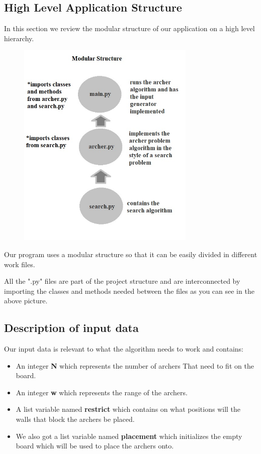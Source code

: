 \documentclass{article}
\begin{document}
\subsection{High Level Application Structure}
\par In this section we review the modular structure of our application on a high level hierarchy. 
\begin{figure}[h]
\includegraphics[width=12 cm, height=10cm]{figure3}
\end{figure}
\par Our program uses a modular structure so that it can be easily divided 
in different work files.
\par All the ".py" files are part of the project structure and are interconnected by importing the classes and methods needed between the files as you can see in the above picture.
\newpage
\subsection{Description of input data}
\par Our input data is relevant to what the algorithm needs to work and contains:
 \begin{itemize}
     \item An integer \textbf{N} which represents the number of archers That need to fit on the board.
    \item An integer \textbf{w} which represents the range of the archers.
     \item A list variable named \textbf{restrict} which contains on what positions will the walls that block the archers be placed.
    \item We also got a list variable named \textbf{placement} which initializes the empty board which will be used to place the archers onto.
   \end{itemize}
\end{document}
